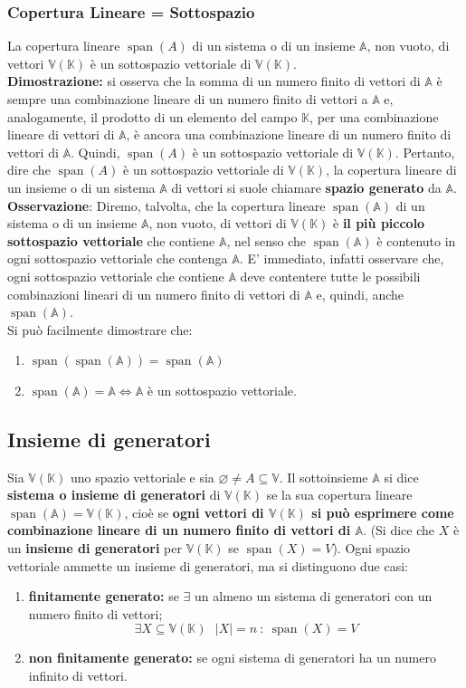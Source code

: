 \documentclass{article}
\DeclareMathOperator{\Span}{span}
\newcommand{\sa}{\Span(\mathbb{A})}
\newcommand{\V}{\mathbb{V} (\mathbb{K})}
\begin{document}
\subsubsection{Copertura Lineare = Sottospazio}
La copertura lineare $\Span(A)$ di un sistema o di un insieme $\mathbb A$, non
vuoto, di vettori $\mathbb V(\mathbb K)$ è un sottospazio vettoriale di
$\mathbb V(\mathbb K)$.\\ 
\textbf{Dimostrazione:} si osserva che la somma di un numero finito di vettori di $\mathbb A$ è sempre una combinazione lineare di un numero finito di vettori a $\mathbb A$ e, analogamente, il prodotto di un elemento del campo $\mathbb K$, per una combinazione lineare di vettori di $\mathbb A$, è ancora una combinazione lineare di un numero finito di vettori di $\mathbb A$. 
Quindi, $\Span(A)$ è  un sottospazio vettoriale di $\V$.
Pertanto, dire che $\Span(A)$ è un sottospazio vettoriale di $\V$, la copertura lineare di un insieme o di un sistema $\mathbb A$ di vettori si suole chiamare \textbf{spazio generato} da $\mathbb A$.
\\
\textbf{Osservazione}: Diremo, talvolta, che la copertura lineare $\sa$ di un sistema o di un insieme $\mathbb A$, non vuoto, di vettori di $\V$ è \textbf{il più piccolo sottospazio vettoriale} che contiene $\mathbb A$,
nel senso che $\sa$ è contenuto in ogni sottospazio vettoriale che contenga $\mathbb A$. E' immediato, infatti osservare che, ogni sottospazio vettoriale che contiene $\mathbb A$ deve contentere tutte le possibili combinazioni lineari di un numero finito di vettori di $\mathbb A$ e, quindi, anche $\sa$.\\
Si può facilmente dimostrare che:
\begin{enumerate}
    \item $\Span(\sa) = \sa$
    \item $\sa = \mathbb A \iff \mathbb A$ è un sottospazio vettoriale.
\end{enumerate}

\subsection{Insieme di generatori}
Sia $\V$ uno spazio vettoriale e sia $\varnothing \ne A \subseteq \mathbb V$. Il sottoinsieme $\mathbb A$ si dice \textbf{sistema o insieme di generatori} di
$\V$ se la sua copertura lineare $\sa = \V$, cioè se \textbf{ogni vettori di $\V$ si può esprimere come combinazione lineare di un numero finito di vettori di $\mathbb A$}.
(Si dice che $X$ è un \textbf{insieme di generatori} per $\V$ se $\Span(X) = V$).
Ogni spazio vettoriale ammette un insieme di generatori, ma si distinguono due casi:
\begin{enumerate}
    \item \textbf{finitamente generato:} se $\exists$ un almeno un sistema di generatori con un numero finito di vettori;
    \[
        \exists X \subseteq \V \ \ \ |X|=n \ : \ \Span(X) = V
    \]
    \item \textbf{non finitamente generato:} se ogni sistema di generatori ha un numero infinito di vettori.
\end{enumerate}
\end{document}
